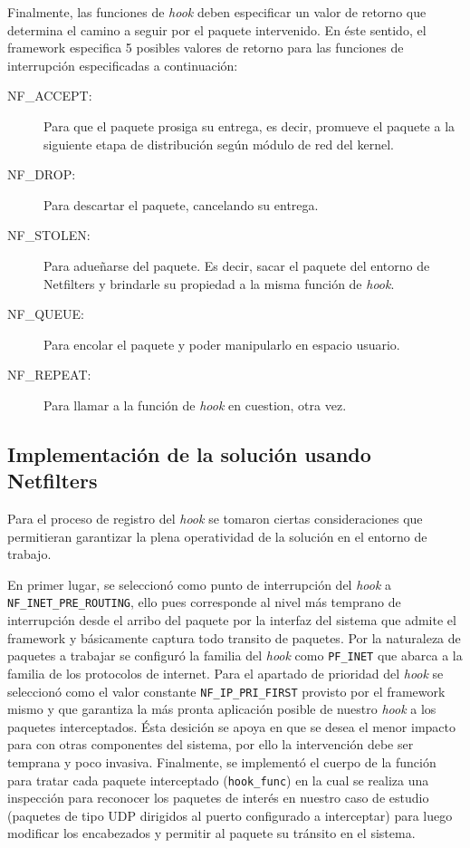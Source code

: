 Finalmente, las funciones de \emph{hook} deben especificar un valor de retorno que determina el camino a seguir por el paquete intervenido. En éste sentido, el framework especifica 5 posibles valores de retorno para las funciones de interrupción especificadas a continuación:
\begin{description}
\item[NF\_ACCEPT:] Para que el paquete prosiga su entrega, es decir, promueve el paquete a la siguiente etapa de distribución según módulo de red del kernel.
\item[NF\_DROP:] Para descartar el paquete, cancelando su entrega.
\item[NF\_STOLEN:] Para adueñarse del paquete. Es decir, sacar el paquete del entorno de Netfilters y brindarle su propiedad a la misma función de \emph{hook}.
\item[NF\_QUEUE:] Para encolar el paquete y poder manipularlo en espacio usuario.
\item[NF\_REPEAT:] Para llamar a la función de \emph{hook} en cuestion, otra vez.
\end{description}

\subsection{Implementación de la solución usando Netfilters}
Para el proceso de registro del \emph{hook} se tomaron ciertas consideraciones que permitieran garantizar la plena operatividad de la solución en el entorno de trabajo.

En primer lugar, se seleccionó como punto de interrupción del \emph{hook} a \verb=NF_INET_PRE_ROUTING=, ello pues corresponde al nivel más temprano de interrupción desde el arribo del paquete por la interfaz del sistema que admite el framework y básicamente captura todo transito de paquetes. Por la naturaleza de paquetes a trabajar se configuró la familia del \emph{hook} como \verb=PF_INET= que abarca a la familia de los protocolos de internet. Para el apartado de prioridad del \emph{hook} se seleccionó como el valor constante \verb=NF_IP_PRI_FIRST= provisto por el framework mismo y que garantiza la más pronta aplicación posible de nuestro \emph{hook} a los paquetes interceptados. Ésta desición se apoya en que se desea el menor impacto para con otras componentes del sistema, por ello la intervención debe ser temprana y poco invasiva. Finalmente, se implementó el cuerpo de la función para tratar cada paquete interceptado (\verb=hook_func=) en la cual se realiza una inspección para reconocer los paquetes de interés en nuestro caso de estudio (paquetes de tipo UDP dirigidos al puerto configurado a interceptar) para luego modificar los encabezados y permitir al paquete su tránsito en el sistema.


